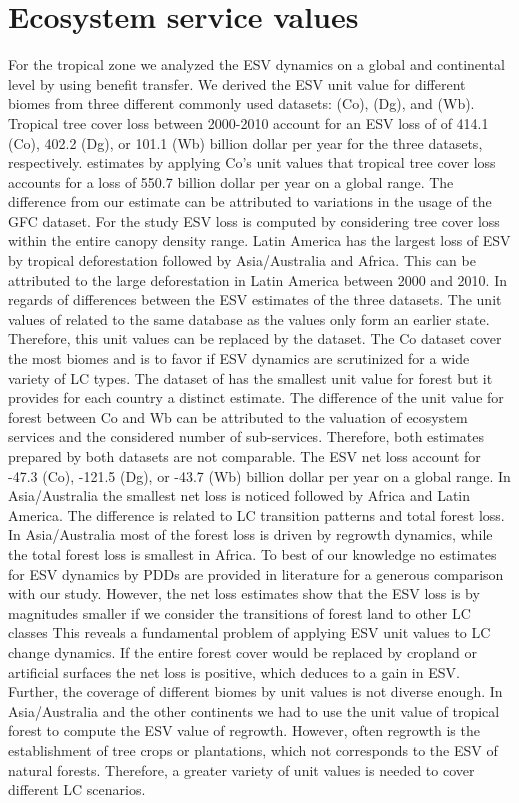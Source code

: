 	\section{Ecosystem service values}
		For the tropical zone we analyzed the \ac{ESV} dynamics on a global and continental level by using benefit transfer. We derived the \ac{ESV} unit value for different biomes from three different commonly used datasets: \citet{Costanza2014} (Co), \citet{Groot2012} (Dg), and \citet{Siikamaki2015} (Wb). Tropical tree cover loss between 2000-2010 account for an \ac{ESV} loss of of 414.1 (Co), 402.2 (Dg), or 101.1 (Wb) billion dollar per year for the three datasets, respectively. \citet{Song2018} estimates by applying Co's unit values that tropical tree cover loss accounts for a loss of 550.7 billion dollar per year on a global range. The difference from our estimate can be attributed to variations in the usage of the \ac{GFC} dataset. For the study \ac{ESV} loss is computed by considering tree cover loss within the entire canopy density range. Latin America has the largest loss of \ac{ESV} by tropical deforestation followed by Asia/Australia and Africa. This can be attributed to the large deforestation in Latin America between 2000 and 2010. In regards of differences between the \ac{ESV} estimates of the three datasets. The unit values of \citet{Groot2012} related to the same database as the \citet{Costanza2014} values only form an earlier state. Therefore, this unit values can be replaced by the \citet{Costanza2014} dataset. The Co dataset cover the most biomes and is to favor if \ac{ESV} dynamics are scrutinized for a wide variety of \ac{LC} types. The dataset of \citet{Siikamaki2015} has the smallest unit value for forest but it provides for each country a distinct estimate. The difference of the unit value for forest between Co and Wb can be attributed to the valuation of ecosystem services and the considered number of sub-services. Therefore, both estimates prepared by both datasets are not comparable. The \ac{ESV} net loss account for -47.3 (Co), -121.5 (Dg), or -43.7 (Wb) billion dollar per year on a global range. In Asia/Australia the smallest net loss is noticed followed by Africa and Latin America. The difference is related to \ac{LC} transition patterns and total forest loss. In Asia/Australia most of the forest loss is driven by regrowth dynamics, while the total forest loss is smallest in Africa. To best of our knowledge no estimates for \ac{ESV} dynamics by \acp{PDD} are provided in literature for a generous comparison with our study. However, the net loss estimates show that the \ac{ESV} loss is by magnitudes smaller if we consider the transitions of forest land to other \ac{LC} classes This reveals a fundamental problem of applying \ac{ESV} unit values to \ac{LC} change dynamics. If the entire forest cover would be replaced by cropland or artificial surfaces the net loss is positive, which deduces to a gain in \ac{ESV}. Further, the coverage of different biomes by unit values is not diverse enough. In Asia/Australia and the other continents we had to use the unit value of tropical forest to compute the \ac{ESV} value of regrowth. However, often regrowth is the establishment of tree crops or plantations, which not corresponds to the \ac{ESV} of natural forests. Therefore, a greater variety of unit values is needed to cover different \ac{LC} scenarios.